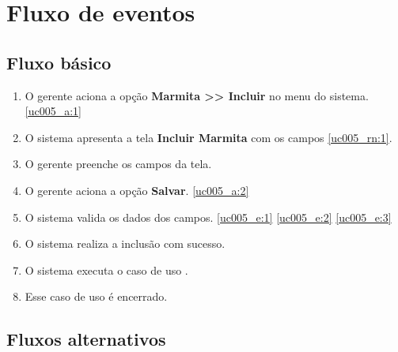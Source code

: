 \section{Fluxo de eventos}

\subsection{Fluxo básico}

\begin{enumerate}[label=P\arabic*]
	\item O gerente aciona a opção \textbf{Marmita >> Incluir} no menu do sistema. \label{uc005_p:1}\ref{uc005_a:1}
	\item O sistema apresenta a tela \textbf{Incluir Marmita} com os campos \ref{uc005_rn:1}. \label{uc005_p:2}
	\item O gerente preenche os campos da tela. \label{uc005_p:3}
	\item O gerente aciona a opção \textbf{Salvar}. \label{uc005_p:4}\ref{uc005_a:2}
	\item O sistema valida os dados dos campos. \ref{uc005_e:1} \ref{uc005_e:2} \ref{uc005_e:3}
	\item O sistema realiza a inclusão com sucesso.
	\item O sistema executa o caso de uso .
	\item Esse caso de uso é encerrado.	
\end{enumerate}

\subsection{Fluxos alternativos}

